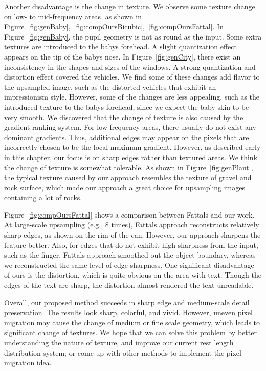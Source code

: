 Another disadvantage is the change in texture. We observe some texture change on low- to mid-frequency areas, as shown in Figure~\ref{fig:genBaby},~\ref{fig:compOursBicubic},~\ref{fig:compOursFattal}. In Figure~\ref{fig:genBaby}, the pupil geometry is not as round as the input. Some extra textures are introduced to the baby\textquotesingle s forehead. A slight quantization effect appears on the tip of the baby\textquotesingle s nose. In Figure~\ref{fig:genCity}, there exist an inconsistency in the shapes and sizes of the windows. A strong quantization and distortion effect covered the vehicles. We find some of these changes add flavor to the upsampled image, such as the distorted vehicles that exhibit an impressionism style. However, some of the changes are less appealing, such as the introduced texture to the baby\textquotesingle s forehead, since we expect the baby skin to be very smooth. We discovered that the change of texture is also caused by the gradient ranking system. For low-frequency areas, there usually do not exist any dominant gradients. Thus, additional edges may appear on the pixels that are incorrectly chosen to be the local maximum gradient. However, as described early in this chapter, our focus is on sharp edges rather than textured areas. We think the change of texture is somewhat tolerable. As shown in Figure~\ref{fig:genPlant}, the typical texture caused by our approach resembles the texture of gravel and rock surface, which made our approach a great choice for upsampling images containing a lot of rocks. 

Figure~\ref{fig:compOursFattal} shows a comparison between Fattal\textquotesingle s and our work. At large-scale upsampling (e.g., 8 times), Fattal\textquotesingle s approach reconstructs relatively sharp edges, as shown on the rim of the can. However, our approach sharpens the feature better. Also, for edges that do not exhibit high sharpness from the input, such as the finger, Fattal\textquotesingle s approach smoothed out the object boundary, whereas we reconstructed the same level of edge sharpness. One significant disadvantage of ours is the distortion, which is quite obvious on the area with text. Though the edges of the text are sharp, the distortion almost rendered the text unreadable. 

Overall, our proposed method succeeds in sharp edge and medium-scale detail preservation. The results look sharp, colorful, and vivid. However, uneven pixel migration may cause the change of medium or fine scale geometry, which leads to significant change of textures. We hope that we can solve this problem by better understanding the nature of texture, and improve our current rest length distribution system; or come up with other methods to implement the pixel migration idea.

